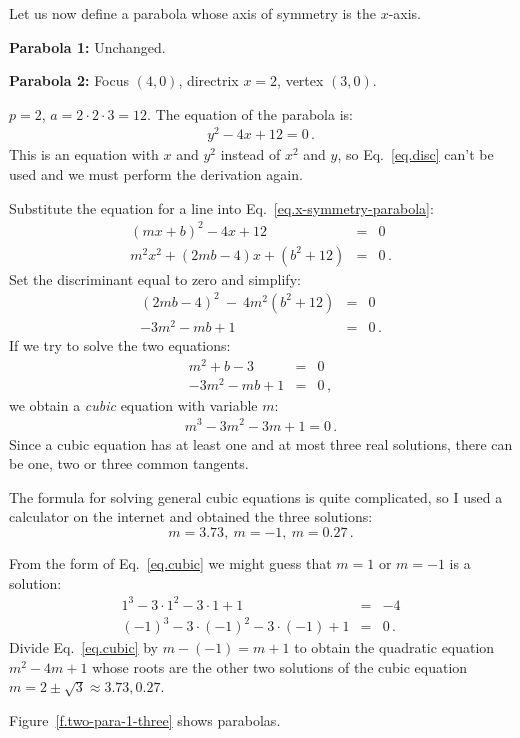 \begin{example}\mbox{}

\noindent Let us now define a parabola whose axis of symmetry is the $x$-axis.

\noindent\textbf{Parabola 1:} Unchanged. 

\noindent\textbf{Parabola 2:} Focus $(4,0)$, directrix $x=2$, vertex $(3,0)$.

\noindent{}$p=2$, $a=2\cdot 2\cdot 3=12$. The equation of the parabola is:
\begin{align}
y^2-4x+12 = 0\,.\label{eq.x-symmetry-parabola}
\end{align}
This is an equation with $x$ and $y^2$ instead of $x^2$ and $y$, so Eq.~\ref{eq.disc} can't be used and we must perform the derivation again.

Substitute the equation for a line into Eq.~\ref{eq.x-symmetry-parabola}:
%
\begin{eqnarray*}
(mx+b)^2-4x+12&=&0\\
m^2x^2+(2mb-4)x+(b^2+12)&=&0\,.
\end{eqnarray*}
Set the discriminant equal to zero and simplify:
%
\begin{eqnarray*}
(2mb-4)^2\:-\:4m^2(b^2+12)&=&0\\
-3m^2-mb+1&=&0\,.
\end{eqnarray*}
If we try to solve the two equations:
%
\begin{eqnarray*}
m^2+b-3&=&0\\
-3m^2-mb+1&=&0\,,
\end{eqnarray*}
we obtain a \emph{cubic} equation with variable $m$:
\begin{align}
m^3-3m^2-3m+1=0\,.\label{eq.cubic}
\end{align}
Since a cubic equation has at least one and at most three real solutions, there can be one, two or three common tangents.

The formula for solving general cubic equations is quite complicated, so I used a calculator on the internet and obtained the three solutions:
\[m=3.73,\:m=-1,\:m=0.27\,.\]

\newpage

From the form of Eq.~\ref{eq.cubic} we might guess that $m=1$ or $m=-1$ is a solution:
\begin{eqnarray*}
1^3-3\cdot 1^2-3\cdot 1+1&=&-4\\
(-1)^3-3\cdot (-1)^2-3\cdot(-1)+1&=&0\,.
\end{eqnarray*}
Divide Eq.~\ref{eq.cubic} by $m-(-1)=m+1$ to obtain the quadratic equation $m^2-4m+1$ whose roots are the other two solutions of the cubic equation $m=2\pm\sqrt{3}\approx 3.73, 0.27$.

Figure~\ref{f.two-para-1-three} shows parabolas.
\end{example}

